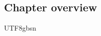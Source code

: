 \begin{CJK}{UTF8}{gbsn}
\section{Chapter overview}



\myparagraph{}








                                              \end{CJK}{UTF8}{gbsn}
